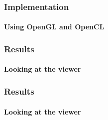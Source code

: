 \documentclass[
    beamer                                       %
  ,table,dvipsnames,svgnames
]{common/mytemplate}
\begin{document}

% 
% 
\begin{frame}
\frametitle{Implementation}
\framesubtitle{Using OpenGL and OpenCL}
\vspace{-15pt}
\begin{figure}[H]
\begin{narrow}{-0.9cm}{-0.9cm}
\end{narrow}
\end{figure}
\end{frame}


{
%
\begin{frame}
\frametitle{Results}
\framesubtitle{Looking at the viewer}
\vspace{8cm}
\end{frame}
}

{
%
\begin{frame}
\frametitle{Results}
\framesubtitle{Looking at the viewer}
\vspace{8cm}
\end{frame}
}
\end{document}
